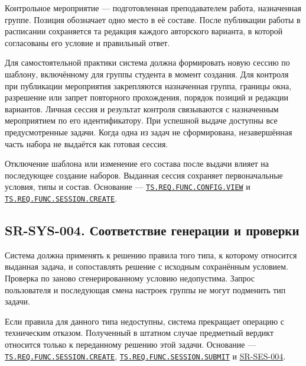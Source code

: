 \documentclass[12pt,a4paper]{article}
\begin{document}
\hypertarget{sr-sys-003-согласованный-состав-набора}{}

\hypertarget{sr-sys-003}{}

Контрольное мероприятие --- подготовленная преподавателем работа, назначенная группе. Позиция обозначает одно место в её составе. После публикации работы в расписании сохраняется та редакция каждого авторского варианта, в которой согласованы его условие и правильный ответ.

Для самостоятельной практики система должна формировать новую сессию по шаблону, включённому для группы студента в момент создания. Для контроля при публикации мероприятия закрепляются назначенная группа, границы окна, разрешение или запрет повторного прохождения, порядок позиций и редакции вариантов. Личная сессия и результат контроля связываются с назначенным мероприятием по его идентификатору. При успешной выдаче доступны все предусмотренные задачи. Когда одна из задач не сформирована, незавершённая часть набора не выдаётся как готовая сессия.

Отключение шаблона или изменение его состава после выдачи влияет на последующее создание наборов. Выданная сессия сохраняет первоначальные условия, типы и состав. Основание --- {\href{../02\_Техническое\_задание/Техническое\_задание.pdf\#ts-req-func-config-view}{\texttt{TS.\allowbreak{}REQ.\allowbreak{}FUNC.\allowbreak{}CONFIG.\allowbreak{}VIEW}}} и {\href{../02\_Техническое\_задание/Техническое\_задание.pdf\#ts-req-func-session-create}{\texttt{TS.\allowbreak{}REQ.\allowbreak{}FUNC.\allowbreak{}SESSION.\allowbreak{}CREATE}}}.

\subsection{SR-SYS-004. Соответствие генерации и проверки}\label{sr-sys-004-ux441ux43eux43eux442ux432ux435ux442ux441ux442ux432ux438ux435-ux433ux435ux43dux435ux440ux430ux446ux438ux438-ux438-ux43fux440ux43eux432ux435ux440ux43aux438}

\hypertarget{sr-sys-004-соответствие-генерации-и-проверки}{}

\hypertarget{sr-sys-004}{}

Система должна применять к решению правила того типа, к которому относится выданная задача, и сопоставлять решение с исходным сохранённым условием. Проверка по заново сгенерированному условию недопустима. Запрос пользователя и последующая смена настроек группы не могут подменить тип задачи.

Если правила для данного типа недоступны, система прекращает операцию с техническим отказом. Полученный в штатном случае предметный вердикт относится только к переданному решению этой задачи. Основание --- {\href{../02\_Техническое\_задание/Техническое\_задание.pdf\#ts-req-func-session-create}{\texttt{TS.\allowbreak{}REQ.\allowbreak{}FUNC.\allowbreak{}SESSION.\allowbreak{}CREATE}}}, {\href{../02\_Техническое\_задание/Техническое\_задание.pdf\#ts-req-func-session-submit}{\texttt{TS.\allowbreak{}REQ.\allowbreak{}FUNC.\allowbreak{}SESSION.\allowbreak{}SUBMIT}}} и {\hyperlink{sr-ses-004}{SR-SES-004}}.
\end{document}
